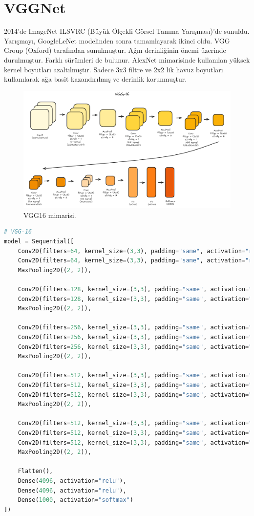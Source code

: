 \section{VGGNet}
2014'de ImageNet ILSVRC (Büyük Ölçekli Görsel Tanıma Yarışması)'de sunuldu. Yarışmayı, GoogleLeNet modelinden sonra tamamlayarak ikinci oldu. VGG Group (Oxford) tarafından sunulmuştur. Ağın derinliğinin önemi üzerinde durulmuştur. Farklı sürümleri de bulunur. AlexNet mimarisinde kullanılan yüksek kernel boyutları azaltılmıştır. Sadece 3x3 filtre ve 2x2 lik havuz boyutları kullanılarak ağa basit kazandırılmış ve derinlik korunmuştur.

\begin{figure}[h]
    \centering
    \includegraphics[width=1\textwidth]{images/vgg16.png}
    \caption{VGG16 mimarisi.}
    \label{fig:enter-label}
\end{figure}

\begin{lstlisting}[language=Python]
# VGG-16
model = Sequential([
	Conv2D(filters=64, kernel_size=(3,3), padding="same", activation="relu"),
	Conv2D(filters=64, kernel_size=(3,3), padding="same", activation="relu"),
	MaxPooling2D((2, 2)),
	
	Conv2D(filters=128, kernel_size=(3,3), padding="same", activation="relu"),
	Conv2D(filters=128, kernel_size=(3,3), padding="same", activation="relu"),
	MaxPooling2D((2, 2)),
	
	Conv2D(filters=256, kernel_size=(3,3), padding="same", activation="relu"),
	Conv2D(filters=256, kernel_size=(3,3), padding="same", activation="relu"),
	Conv2D(filters=256, kernel_size=(3,3), padding="same", activation="relu"),
	MaxPooling2D((2, 2)),
	
	Conv2D(filters=512, kernel_size=(3,3), padding="same", activation="relu"),
	Conv2D(filters=512, kernel_size=(3,3), padding="same", activation="relu"),
	Conv2D(filters=512, kernel_size=(3,3), padding="same", activation="relu"),
	MaxPooling2D((2, 2)),
	
	Conv2D(filters=512, kernel_size=(3,3), padding="same", activation="relu"),
	Conv2D(filters=512, kernel_size=(3,3), padding="same", activation="relu"),
	Conv2D(filters=512, kernel_size=(3,3), padding="same", activation="relu"),
	MaxPooling2D((2, 2)),
	
	Flatten(),
	Dense(4096, activation="relu"),
	Dense(4096, activation="relu"),
	Dense(1000, activation="softmax")					
])
\end{lstlisting}

\newpage
